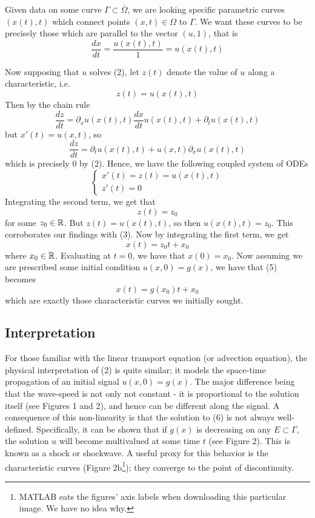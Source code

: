 \documentclass{myproject}
\begin{document}
Given data on some curve $ \Gamma \subset \overline{\Omega} $, we are looking specific parametric curves $ (x(t), t) $ which connect points $(x, t) \in \Omega$ to $ \Gamma $. We want these curves to be precisely those which are parallel to the vector $(u, 1)$, that is
\[
    \frac{dx}{dt} = \frac{u(x(t), t)}{1} = u(x(t), t)
\]

Now supposing that $u$ solves (2), let $z(t)$ denote the value of $u$ along a characteristic, i.e. 
\[
    z(t) = u(x(t), t)
\]
Then by the chain rule
\[
    \frac{dz}{dt} = \partial_x u(x(t), t) \frac{dx}{dt}u(x(t), t) + \partial_t u(x(t), t)
\]
but $ x'(t) = u(x,t) $, so
\[
    \frac{dz}{dt} = \partial_t u(x(t), t) + u(x,t)\partial_x u(x(t), t)
\]
which is precisely 0 by (2). Hence, we have the following coupled system of ODEs
\begin{equation}
    \begin{cases}
        x'(t) = z(t) = u(x(t), t) \\
        z'(t) = 0
    \end{cases}
\end{equation}
Integrating the second term, we get that
\[
    z(t) = z_0
\]
for some $ z_0 \in \operatorname{\mathbb{R}} $. But $z(t) = u(x(t), t)$, so then $u(x(t), t) = z_0$. This corroborates our findings with (3). Now by integrating the first term, we get
\begin{equation}
    x(t) = z_0t + x_0
\end{equation}
where $ x_0 \in \operatorname{\mathbb{R}} $. Evaluating at $t=0$, we have that $x(0) = x_0$. Now assuming we are prescribed some initial condition $u(x,0) = g(x)$, we have that (5) becomes
\begin{equation}
    x(t) = g(x_0)t + x_0
\end{equation}
which are exactly those characteristic curves we initially sought.

\subsection{Interpretation}

For those familiar with the linear transport equation (or advection equation), the physical interpretation of (2) is quite similar; it models the space-time propagation of an initial signal $u(x,0) = g(x)$. The major difference being that the wave-speed is not only not constant - it is proportional to the solution itself (see Figures 1 and 2), and hence can be different along the signal. A consequence of this non-linearity is that the solution to (6) is not always well-defined. Specifically, it can be shown that if $g(x)$ is decreasing on any $E \subset \Gamma$, the solution $u$ will become multivalued at some time $t$ (see Figure 2). This is known as a shock or shockwave. A useful proxy for this behavior is the characteristic curves (Figure 2b\footnote{MATLAB eats the figures' axis labels when downloading this particular image. We have no idea why.}); they converge to the point of discontinuity.
\end{document}
